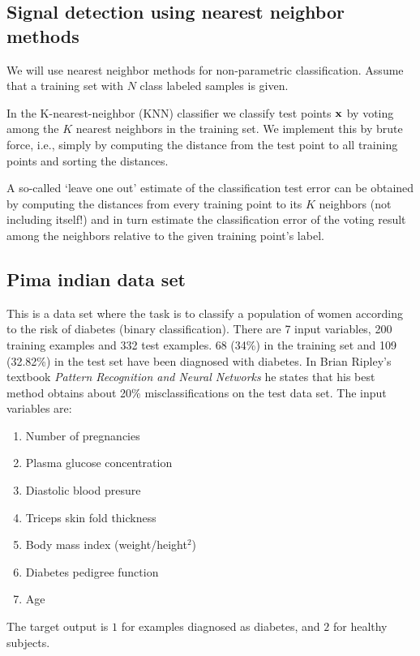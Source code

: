 \documentclass[12pt]{article}    %
\def\xb{{\bf x}}
\begin{document}
\subsection*{Signal detection using nearest neighbor methods}
We will use nearest neighbor methods for non-parametric classification.
Assume that a training set with $N$ class labeled samples is given.

In the K-nearest-neighbor (KNN) classifier we classify test points $\xb$ by voting among
the $K$ nearest neighbors in the training set. We implement this by brute force, i.e., simply by computing the
distance from the test point to all training points and sorting the distances.

A so-called `leave one out' estimate of the classification test error
can be obtained by computing the distances from every training point
to its $K$ neighbors (not including itself!)
and in turn estimate the classification error of the voting result
among the neighbors relative to the given training point's label.



\subsection*{Pima indian data set}

This is a data set where the task is to classify a
population of women according to the risk of diabetes (binary classification).
There are 7 input variables, 200 training examples and 332 test
examples. 68 (34\%) in the training set and 109 (32.82\%) in the test
set have been diagnosed with diabetes.
In Brian Ripley's textbook {\em Pattern Recognition and Neural Networks} he
states that his best method obtains about 20\% misclassifications on the test data set.
The input variables are:

\begin{enumerate}
\item Number of pregnancies
\item Plasma glucose concentration
\item Diastolic blood presure
\item Triceps skin fold thickness
\item Body mass index (weight/height$^2$)
\item Diabetes pedigree function
\item Age
\end{enumerate}

The target output is $1$ for examples diagnosed as diabetes, and $2$ for healthy subjects.
\end{document}
